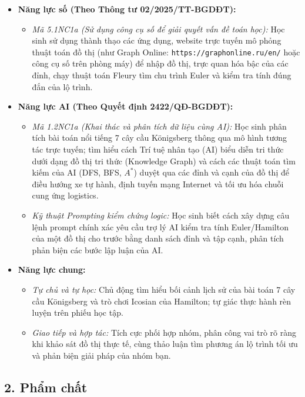 \documentclass[12pt, a4paper]{article}
\begin{document}
\begin{itemize}[leftmargin=1.2cm]
    \item \textbf{Năng lực số (Theo Thông tư 02/2025/TT-BGDĐT):}
    \begin{itemize}[leftmargin=0.6cm]
        \item \textit{Mã 5.1NC1a (Sử dụng công cụ số để giải quyết vấn đề toán học):} Học sinh sử dụng thành thạo các ứng dụng, website trực tuyến mô phỏng thuật toán đồ thị (như Graph Online: \texttt{https://graphonline.ru/en/} hoặc công cụ số trên phòng máy) để nhập đồ thị, trực quan hóa bậc của các đỉnh, chạy thuật toán Fleury tìm chu trình Euler và kiểm tra tính đúng đắn của lộ trình.
    \end{itemize}

    \item \textbf{Năng lực AI (Theo Quyết định 2422/QĐ-BGDĐT):}
    \begin{itemize}[leftmargin=0.6cm]
        \item \textit{Mã 1.2NC1a (Khai thác và phân tích dữ liệu cùng AI):} Học sinh phân tích bài toán nổi tiếng 7 cây cầu Königsberg thông qua mô hình tương tác trực tuyến; tìm hiểu cách Trí tuệ nhân tạo (AI) biểu diễn tri thức dưới dạng đồ thị tri thức (Knowledge Graph) và cách các thuật toán tìm kiếm của AI (DFS, BFS, $A^*$) duyệt qua các đỉnh và cạnh của đồ thị để điều hướng xe tự hành, định tuyến mạng Internet và tối ưu hóa chuỗi cung ứng logistics.
        \item \textit{Kỹ thuật Prompting kiểm chứng logic:} Học sinh biết cách xây dựng câu lệnh prompt chính xác yêu cầu trợ lý AI kiểm tra tính Euler/Hamilton của một đồ thị cho trước bằng danh sách đỉnh và tập cạnh, phân tích phản biện các bước lập luận của AI.
    \end{itemize}

    \item \textbf{Năng lực chung:}
    \begin{itemize}[leftmargin=0.6cm]
        \item \textit{Tự chủ và tự học:} Chủ động tìm hiểu bối cảnh lịch sử của bài toán 7 cây cầu Königsberg và trò chơi Icosian của Hamilton; tự giác thực hành rèn luyện trên phiếu học tập.
        \item \textit{Giao tiếp và hợp tác:} Tích cực phối hợp nhóm, phân công vai trò rõ ràng khi khảo sát đồ thị thực tế, cùng thảo luận tìm phương án lộ trình tối ưu và phản biện giải pháp của nhóm bạn.
    \end{itemize}
\end{itemize}

\subsection*{2. Phẩm chất}
\end{document}
